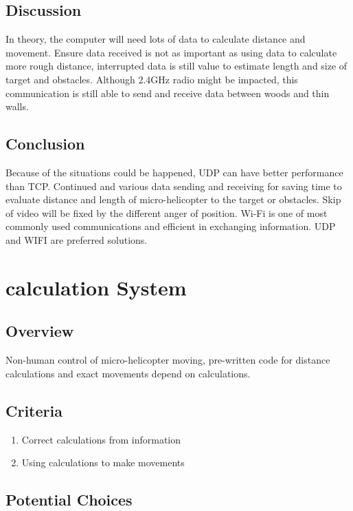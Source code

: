 \documentclass[onecolumn, draftclsnofoot,10pt, compsoc]{IEEEtran}
\begin{document}
\subsection{Discussion}
In theory, the computer will need lots of data to calculate distance and movement.
Ensure data received is not as important as using data to calculate more rough distance,
interrupted data is still value to estimate length and size of target and obstacles.
Although 2.4GHz radio might be impacted, this communication is still able to send and receive data between woods and thin walls.

\subsection{Conclusion}
Because of the situations could be happened, UDP can have better performance than TCP.
Continued and various data sending and receiving for saving time to evaluate distance and length of micro-helicopter to the target or obstacles.
Skip of video will be fixed by the different anger of position. Wi-Fi is one of most commonly used communications and efficient in exchanging information.
UDP and WIFI are preferred solutions.


\section{calculation System}

\subsection{Overview}
Non-human control of micro-helicopter moving, pre-written code for distance calculations and exact movements depend on calculations.

\subsection{Criteria}
\begin{enumerate}
\item{Correct calculations from information}
\item{Using calculations to make movements}
\end{enumerate}

\subsection{Potential Choices}
\end{document}
